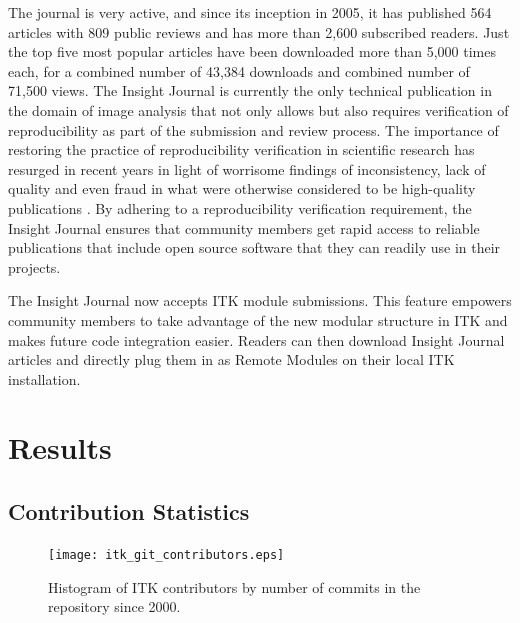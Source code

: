\documentclass{frontiersENG} %
\begin{document}
%
%
%
The journal is very active, and since its inception in 2005, it has published
564 articles with 809 public reviews and has more than 2,600 subscribed
readers. Just the top five most popular articles have been downloaded more than
5,000 times each, for a combined number of 43,384 downloads and combined number
of 71,500 views. The Insight Journal is currently the only technical
publication in the domain of image analysis that not only allows but also
requires verification of reproducibility as part of the submission and review
process. The importance of restoring the practice of reproducibility
verification in scientific research has resurged in recent years in light of
worrisome findings of inconsistency, lack of quality and even fraud in what
were otherwise considered to be high-quality publications \cite{Begley2012}. By
adhering to a reproducibility verification requirement, the Insight Journal
ensures that community members get rapid access to reliable publications that
include open source software that they can readily use in their projects.

The Insight Journal now accepts ITK module submissions. This feature empowers
community members to take advantage of the new modular structure in ITK and
makes future code integration easier. Readers can then download Insight Journal
articles and directly plug them in as Remote Modules on their local ITK
installation.




\section{Results}



\subsection{Contribution Statistics}

\begin{figure}
  \centering
    \texttt{[image: itk\_git\_contributors.eps]}
    \caption{Histogram of ITK contributors by number of commits in the repository since 2000.}
    \label{fig:ITKGitContributors}
\end{figure}
\end{document}
